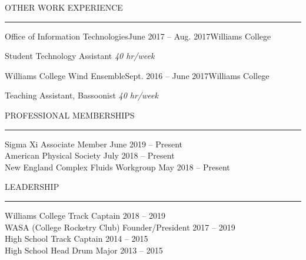 \documentclass{resume} %
\renewenvironment{rSection}[1]{
	\sectionskip
	\textcolor{RoyalPurple}{\MakeUppercase{#1}}
	\sectionlineskip
	\hrule
	\begin{list}{}{
			\setlength{\leftmargin}{1.5em}
		}
		\item[]
	}{
	\end{list}
}
\begin{document}
\begin{rSection}{Other Work Experience} \itemsep -2pt
	\begin{rSubsection}{Office of Information Technologies}{June 2017 -- Aug. 2017}{}{Williams College}{}
	\item {Student Technology Assistant} \hfill {\em 40 hr/week}
	\end{rSubsection}
	\begin{rSubsection}{Williams College Wind Ensemble}{Sept. 2016 -- June 2017}{}{Williams College}{}
	\item {Teaching Assistant, Bassoonist} \hfill {\em 40 hr/week}
	\end{rSubsection}

\end{rSection}

	\begin{rSection}{Professional Memberships} \itemsep -2pt
		{Sigma Xi Associate Member} \hfill {June 2019 -- Present}\\
		{American Physical Society} \hfill {July 2018 -- Present}
		\\
		{New England Complex Fluids Workgroup} \hfill {May 2018 -- Present}

	\end{rSection}

		\begin{rSection}{Leadership} \itemsep -2pt
		{Williams College Track Captain} \hfill {2018 -- 2019} \\
		{WASA (College Rocketry Club) Founder/President} \hfill {2017 -- 2019} \\
		{High School Track Captain} \hfill {2014 -- 2015}  \\
		{High School Head Drum Major} \hfill {2013 -- 2015}

	\end{rSection}
\end{document}
